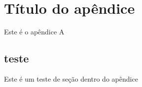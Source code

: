 
\chapter{Título do apêndice}
Este é o apêndice A

\tocless\section{teste}
Este é um teste de seção dentro do apêndice

